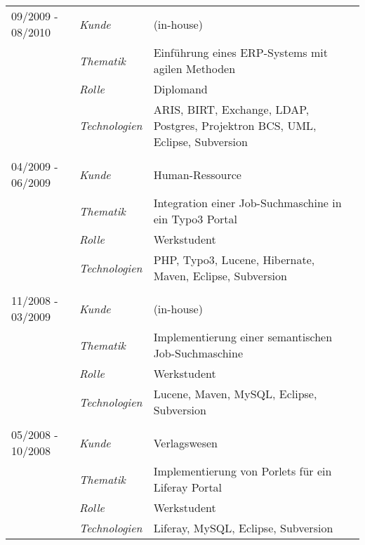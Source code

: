 \begin{longtable}{@{}>{}p{4cm}>{\itshape}p{2cm}>{}p{9cm}}
\\
09/2009 - 08/2010	& Kunde 	    & (in-house)\\
\nopagebreak		& Thematik	    & Einführung eines ERP-Systems mit agilen Methoden\\
\nopagebreak		& Rolle 	    & Diplomand\\
\nopagebreak		& Technologien	& ARIS, BIRT, Exchange, LDAP, Postgres, Projektron BCS, UML, Eclipse, Subversion\\
\\
04/2009 - 06/2009	& Kunde 	    & Human-Ressource\\
\nopagebreak		& Thematik	    & Integration einer Job-Suchmaschine in ein Typo3 Portal\\
\nopagebreak		& Rolle 	    & Werkstudent\\
\nopagebreak		& Technologien	& PHP, Typo3, Lucene, Hibernate, Maven, Eclipse, Subversion\\
\\
11/2008 - 03/2009	& Kunde 	& (in-house)\\
\nopagebreak		& Thematik	& Implementierung einer semantischen Job-Suchmaschine\\
\nopagebreak		& Rolle 	& Werkstudent\\
\nopagebreak		& Technologien	& Lucene, Maven, MySQL, Eclipse, Subversion\\
\\
05/2008 - 10/2008	& Kunde 	& Verlagswesen\\
\nopagebreak		& Thematik	& Implementierung von Porlets für ein Liferay Portal\\
\nopagebreak		& Rolle 	& Werkstudent\\
\nopagebreak		& Technologien	& Liferay, MySQL, Eclipse, Subversion\\
\end{longtable}
\renewcommand{\arraystretch}{2}


